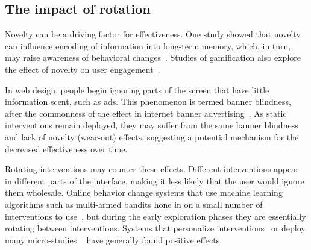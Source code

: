 
\subsection{The impact of rotation}
Novelty can be a driving factor for effectiveness. %
One study showed that novelty can influence encoding of information into long-term memory, which, in turn, may raise awareness of behavioral changes~\cite{doi:10.1111/j.1467-9450.2005.00443.x}. Studies of gamification also explore the effect of novelty on user engagement~\cite{6758978}.  %

In web design, people begin ignoring parts of the screen that have little information scent, such as ads. This phenomenon is termed banner blindness, after the commonness of the effect in internet banner advertising~\cite{benway1998banner}. As static interventions remain deployed, they may suffer from the same banner blindness and lack of novelty (wear-out) effects, suggesting a potential mechanism for the decreased effectiveness over time.

Rotating interventions may counter these effects.
Different interventions appear in different parts of the interface, making it less likely that the user would ignore them wholesale.
Online behavior change systems that use machine learning algorithms such as multi-armed bandits hone in on a small number of interventions to use~\cite{paredes2014poptherapy, rabbi2014automated}, but during the early exploration phases they are essentially rotating between interventions. %
Systems that personalize interventions~\cite{kaptein2015personalizing} or deploy many micro-studies%
~\cite{doi:10.1111/j.1740-9713.2015.00863.x}
have generally found positive effects.

